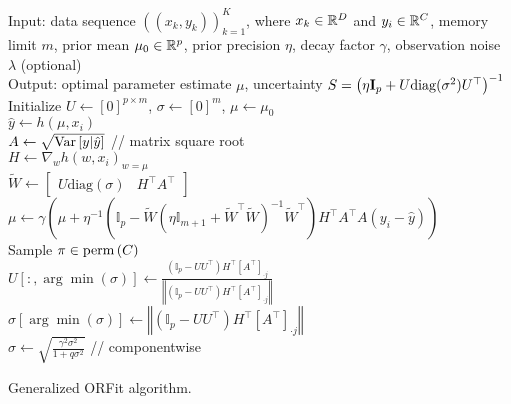 \begin{algorithm*}
Input: data sequence $\left(\left(x_{k},y_{k}\right)\right)_{k=1}^{K}$,
where $x_k \in \mathbb{R}^D$ and $y_i \in \mathbb{R}^C$,
memory limit $m$, prior mean $\mu_{0} \in \mathbb{R}^p$, prior precision $\eta$,
decay factor $\gamma$, observation noise $\lambda$ (optional) \\
Output: optimal parameter estimate $\mu$, 
uncertainty
$S=\left(\eta \mathbf{I}_{p} +U \mathrm{diag}(\sigma^2)U^{\top}\right)^{-1}$ \\
Initialize $U\leftarrow\left[0\right]^{p\times m}$, $\sigma\leftarrow\left[0\right]^{m}$,
$\mu\leftarrow\mu_{0}$ \\
 {
$\hat{y}\leftarrow h\left(\mu,x_{i}\right)$ \\
$A\leftarrow\sqrt{{\rm Var}\left[y\vert\hat{y}\right]}$ // matrix square root \\
$H\leftarrow\nabla_{w}h\left(w,x_{i}\right)_{w=\mu}$ \\
$\tilde{W}\leftarrow\left[\begin{array}{cc}U\text{diag}(\sigma) & H^{\top}A^{\top}\end{array}\right]$ \\
$\mu\leftarrow\gamma\left(\mu+\eta^{-1}\left(\mathbb{I}_{p}-\tilde{W}\left(\eta\mathbb{I}_{m+1}+\tilde{W}^{\top}\tilde{W}\right)^{-1}\tilde{W}^{\top}\right)H^{\top}A^{\top}A\left(y_{i}-\hat{y}\right)\right)$ \\
Sample $\pi\in{\rm perm}\left(C\right)$ \\
 { 
 {
$U\left[:,\arg\min\left(\sigma\right)\right]\leftarrow\frac{\left(\mathbb{I}_{p}-UU^{\top}\right)H^{\top}\left[A^{\top}\right]_{\cdot j}}{\left\Vert \left(\mathbb{I}_{p}-UU^{\top}\right)H^{\top}\left[A^{\top}\right]_{\cdot j}\right\Vert }$ \\
$\sigma\left[\arg\min\left(\sigma\right)\right]\leftarrow\left\Vert \left(\mathbb{I}_{p}-UU^{\top}\right)H^{\top}\left[A^{\top}\right]_{\cdot j}\right\Vert $ \\
}
}
$\sigma\leftarrow\sqrt{\frac{\gamma^{2}\sigma^{2}}{1+q\sigma^{2}}}$ // componentwise \\
}
\caption{Generalized ORFit algorithm.}
\label{alg:ORFit-general}
\end{algorithm*}
